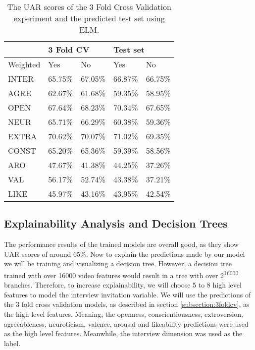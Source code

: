 \begin{table}[h]
\begin{tabular}{|l|r|r|r|r|}
\hline
 & \multicolumn{2}{l|}{3 Fold CV} & \multicolumn{2}{l|}{Test set} \\ \hline
Weighted & \multicolumn{1}{l|}{Yes} & \multicolumn{1}{l|}{No} & \multicolumn{1}{l|}{Yes} & \multicolumn{1}{l|}{No} \\ \hline
INTER & 65.75\% & 67.05\% & 66.87\% & 66.75\% \\ \hline
AGRE & 62.67\% & 61.68\% & 59.35\% & 58.95\% \\ \hline
OPEN & 67.64\% & 68.23\% & 70.34\% & 67.65\% \\ \hline
NEUR & 65.71\% & 66.29\% & 60.38\% & 59.36\% \\ \hline
EXTRA & 70.62\% & 70.07\% & 71.02\% & 69.35\% \\ \hline
CONST & 65.20\% & 65.36\% & 59.39\% & 58.56\% \\ \hline
ARO & 47.67\% & 41.38\% & 44.25\% & 37.26\% \\ \hline
VAL & 56.17\% & 52.74\% & 43.38\% & 37.21\% \\ \hline
LIKE & 45.97\% & 43.16\% & 43.95\% & 42.54\% \\ \hline
\end{tabular}
\caption{The UAR scores of the 3 Fold Cross Validation experiment and the predicted test set using ELM.}
\label{tab:3foldtestuar}
\end{table}

\subsection{Explainability Analysis and Decision Trees}
The performance results of the trained models are overall good, as they show UAR scores of around 65\%. Now to explain the predictions made by our model we will be training and visualizing a decision tree. However, a decision tree trained with over 16000 video features would result in a tree with over 2\textsuperscript{16000} branches. Therefore, to increase explainability, we will choose 5 to 8 high level features to model the interview invitation variable. We will use the predictions of the 3 fold cross validation models, as described in section \ref{subsection:3foldcv}, as the high level features. Meaning, the openness, conscientiousness, extroversion, agreeableness, neuroticism, valence, arousal and likeability predictions were used as the high level features. Meanwhile, the interview dimension was used as the label. 

